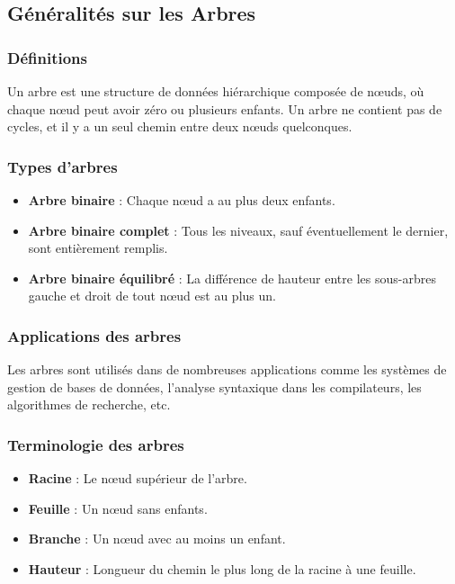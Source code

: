 \subsection{Généralités sur les Arbres}\label{subsec:generalites-sur-les-arbres}

\subsubsection{Définitions}
Un arbre est une structure de données hiérarchique composée de nœuds, où chaque nœud peut avoir zéro ou plusieurs enfants.
Un arbre ne contient pas de cycles, et il y a un seul chemin entre deux nœuds quelconques.

\subsubsection{Types d'arbres}
\begin{itemize}
    \item \textbf{Arbre binaire} : Chaque nœud a au plus deux enfants.
    \item \textbf{Arbre binaire complet} : Tous les niveaux, sauf éventuellement le dernier, sont entièrement remplis.
    \item \textbf{Arbre binaire équilibré} : La différence de hauteur entre les sous-arbres gauche et droit de tout nœud est au plus un.
\end{itemize}

\subsubsection{Applications des arbres}
Les arbres sont utilisés dans de nombreuses applications comme les systèmes de gestion de bases de données, l'analyse syntaxique dans les compilateurs, les algorithmes de recherche, etc.

\subsubsection{Terminologie des arbres}
\begin{itemize}
    \item \textbf{Racine} : Le nœud supérieur de l'arbre.
    \item \textbf{Feuille} : Un nœud sans enfants.
    \item \textbf{Branche} : Un nœud avec au moins un enfant.
    \item \textbf{Hauteur} : Longueur du chemin le plus long de la racine à une feuille.
\end{itemize}

